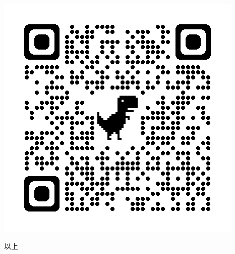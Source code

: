 \documentclass{ltjsarticle}
\begin{document}
\includegraphics{exam.png}\\
\begin{flushright}
    以上
\end{flushright}
\end{document}
